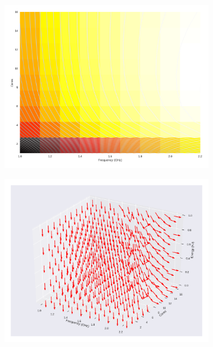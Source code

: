 \begin{figure}[H]

	\centering

	\begin{subfigure}[b]{0.45\textwidth}

		\includegraphics[width=\textwidth]{models/figures/analisys/pleak0.png}

	\end{subfigure}


	\begin{subfigure}[b]{0.45\textwidth}

		\includegraphics[width=\textwidth]{models/figures/analisys/pleak0_3d.png}

	\end{subfigure}

\end{figure}


